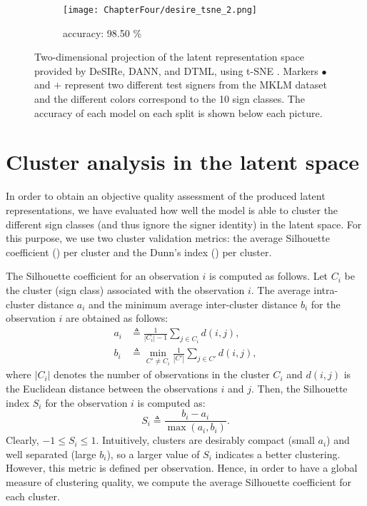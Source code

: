\begin{figure}[ht!]
\begin{minipage}[t!]{0.985\textwidth}
\begin{subfigure}{0.325\textwidth}
            \centering
            \texttt{[image: ChapterFour/desire\_tsne\_2.png]}
            \caption{accuracy: 98.50 \%}
        \end{subfigure}
    \end{minipage}
    \caption{Two-dimensional projection of the latent representation space provided by DeSIRe, DANN, and DTML, using t-SNE \cite{Maaten2008}. Markers $\bullet$ and $\textbf{+}$ represent two different test signers from the MKLM dataset and the different colors correspond to the 10 sign classes. The accuracy of each model on each split is shown below each picture.}
    \label{fig:desire_tsne_b}
\end{figure}

\section{Cluster analysis in the latent space}
\label{sec:desire_clusters}
In order to obtain an objective quality assessment of the produced latent representations, we have evaluated how well the model is able to cluster the different sign classes (and thus ignore the signer identity) in the latent space. For this purpose, we use two cluster validation metrics: the average Silhouette coefficient (\citet{Rousseeuw1987}) per cluster and the Dunn's index (\citet{Dunn1973}) per cluster.

The Silhouette coefficient for an observation $i$ is computed as follows. Let $C_i$ be the cluster (sign class) associated with the observation $i$. The average intra-cluster distance $a_i$ and the minimum average inter-cluster distance $b_i$ for the observation $i$ are obtained as follows:
\begin{align}
    a_i &\triangleq \frac{1}{|C_i|-1} \sum_{j \in C_i} d(i,j),\\
    b_i &\triangleq \min_{C' \neq C_i} \frac{1}{|C'|} \sum_{j \in C'} d(i,j),
\end{align}
where $|C_i|$ denotes the number of observations in the cluster $C_i$ and $d(i,j)$ is the Euclidean distance between the observations $i$ and $j$. Then, the Silhouette index $S_i$ for the observation $i$ is computed as:
\begin{equation}
    S_i \triangleq \frac{b_i - a_i}{\max(a_i, b_i)}.
\end{equation}
Clearly, $-1 \leq S_i \leq 1$. Intuitively, clusters are desirably compact (small $a_i$) and well separated (large $b_i$), so a larger value of $S_i$ indicates a better clustering. However, this metric is defined per observation. Hence, in order to have a global measure of clustering quality, we compute the average Silhouette coefficient for each cluster.

